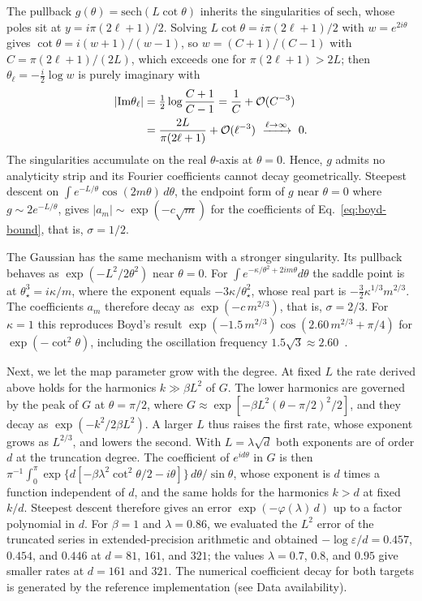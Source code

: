 The pullback $g(\theta)=\mathrm{sech}(L\cot\theta)$ inherits the
singularities of $\mathrm{sech}$, whose poles sit at
$y=i\pi(2\ell+1)/2$.  Solving $L\cot\theta=i\pi(2\ell+1)/2$ with
$w=e^{2i\theta}$ gives $\cot\theta=i(w+1)/(w-1)$, so
$w=(C+1)/(C-1)$ with $C=\pi(2\ell+1)/(2L)$, which exceeds one for
$\pi(2\ell+1)>2L$; then $\theta_\ell=-\tfrac{i}{2}\log w$ is purely
imaginary with
\begin{equation}
	\begin{split}
		|\mathrm{Im}\theta_\ell| &=\tfrac12\log\frac{C+1}{C-1}
		=\frac{1}{C}+\mathcal{O}(C^{-3})\\
		&=\frac{2L}{\pi(2\ell+1)}+\mathcal{O}(\ell^{-3})
		\ \xrightarrow{\ell\to\infty}\ 0.
	\end{split}
\end{equation}
The singularities accumulate on the real $\theta$-axis at
$\theta=0$.  Hence, $g$ admits no analyticity strip and its Fourier
coefficients cannot decay geometrically.  Steepest descent on
$\int e^{-L/\theta}\cos(2m\theta)\,d\theta$, the endpoint form of $g$
near $\theta=0$ where $g\sim 2e^{-L/\theta}$, gives
$|a_m|\sim\exp(-c\sqrt{m})$ for the coefficients of
Eq.~\eqref{eq:boyd-bound}, that is, $\sigma=1/2$.

The Gaussian has the same mechanism with a stronger singularity.
Its pullback behaves as $\exp(-L^2/2\theta^2)$ near $\theta=0$.
For $\int e^{-\kappa/\theta^2+2im\theta}d\theta$ the saddle point
is at $\theta_\star^3=i\kappa/m$, where the exponent equals
$-3\kappa/\theta_\star^2$, whose real part is
$-\tfrac32\kappa^{1/3}m^{2/3}$.  The coefficients $a_m$ therefore
decay as $\exp(-c\,m^{2/3})$, that is, $\sigma=2/3$.  For $\kappa=1$
this reproduces Boyd's result $\exp(-1.5\,m^{2/3})
\cos(2.60\,m^{2/3}+\pi/4)$ for $\exp(-\cot^2\theta)$, including the
oscillation frequency $1.5\sqrt3\approx 2.60$~\cite[Eq.~(2.11)]{Boyd2001}.

Next, we let the map parameter grow with the degree.  At fixed
$L$ the rate derived above holds for the harmonics $k\gg\beta L^2$
of $G$.  The lower harmonics are governed by the peak of $G$ at
$\theta=\pi/2$, where
$G\approx\exp[-\beta L^2(\theta-\pi/2)^2/2]$, and they decay as
$\exp(-k^2/2\beta L^2)$.  A larger $L$ thus raises the first rate,
whose exponent grows as $L^{2/3}$, and lowers the second.  With
$L=\lambda\sqrt{d}$ both exponents are of order $d$ at the
truncation degree.  The coefficient of $e^{id\theta}$ in $G$ is then
$\pi^{-1}\int_0^\pi\exp\{d[-\beta\lambda^2\cot^2\theta/2
-i\theta]\}\,d\theta/\sin\theta$, whose exponent is $d$ times a
function independent of $d$, and the same holds for the harmonics
$k>d$ at fixed $k/d$.  Steepest descent therefore gives an error
$\exp(-\varphi(\lambda)\,d)$ up to a factor polynomial in $d$.
For $\beta=1$ and $\lambda=0.86$, we evaluated the $L^2$ error
of the truncated series in extended-precision arithmetic and
obtained $-\log\varepsilon/d=0.457$, $0.454$, and $0.446$ at $d=81$, $161$,
and $321$; the values $\lambda=0.7$, $0.8$, and $0.95$ give smaller
rates at $d=161$ and $321$.
The numerical coefficient decay for both targets is generated by
the reference implementation (see Data availability).

